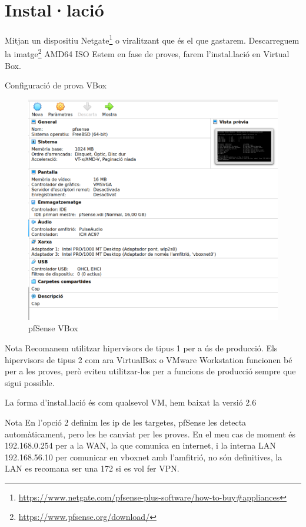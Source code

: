 \documentclass[
  10pt,
]{krantz}
\DeclareRobustCommand{\href}[2]{#2\footnote{\url{#1}}}
\begin{document}
\hypertarget{installaciuxf3}{%
\section{Instal·lació}\label{installaciuxf3}}

Mitjan un dispositiu \href{https://www.netgate.com/pfsense-plus-software/how-to-buy\#appliances}{Netgate} o viralitzant que és el que gastarem. Descarreguem la \href{https://www.pfsense.org/download/}{imatge} AMD64 ISO Estem en fase de proves, farem l'instal.lació en Virtual Box.

Configuració de prova VBox

\begin{figure}
\centering
\includegraphics{imatges/pfSense_vbox.png}
\caption{pfSense VBox}
\end{figure}

\begin{rmdnote}{Nota}
Recomanem utilitzar hipervisors de tipus 1 per a ús de producció. Els hipervisors de tipus 2 com ara VirtualBox o VMware Workstation funcionen bé per a les proves, però eviteu utilitzar-los per a funcions de producció sempre que sigui possible.

\end{rmdnote}

La forma d'instal.lació és com qualsevol VM, hem baixat la versió 2.6

\begin{rmdnote}{Nota}
En l'opció 2 definim les ip de les targetes, pfSense les detecta automàticament, pero les he canviat per les proves. En el meu cas de moment és 192.168.0.254 per a la WAN, la que comunica en internet, i la interna LAN 192.168.56.10 per comunicar en vboxnet amb l'amfitrió, no són definitives, la LAN es recomana ser una 172 si es vol fer VPN.

\end{rmdnote}
\end{document}
